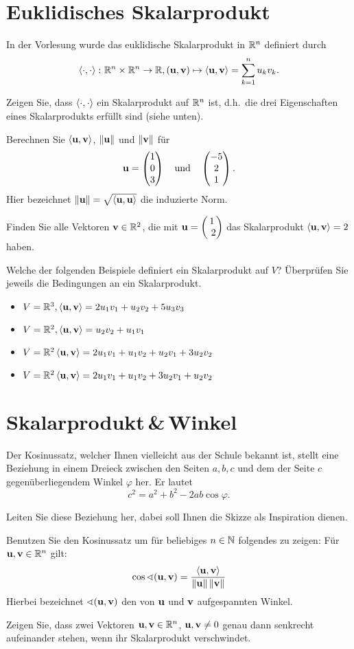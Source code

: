 \documentclass{scrartcl}
\newcommand{\uu}{\mat u}
\newcommand{\vv}{\mat v}
\begin{document}
\section{Euklidisches Skalarprodukt}
In der Vorlesung wurde das euklidische Skalarprodukt in $\RR^n$ definiert durch
\[
  \sp{\cdot}{\cdot} \colon \RR^n \times \RR^n \to \RR, (\uu, \vv) \mapsto \sp{\uu}{\vv} = \sum_{k=1}^n u_k v_k.
\]
\begin{subex}
  \item Zeigen Sie, dass $\sp{\cdot}{\cdot}$ ein Skalarprodukt auf $\RR^n$ ist, d.h.\ die drei Eigenschaften eines Skalarprodukts erfüllt sind (siehe unten).
  \item Berechnen Sie $\sp{\uu}{\vv}$, $\norm{\uu}$ und $\norm{\vv}$ für 
  \[
    \uu = \colvec{1 \\ 0 \\ 3} \quad\mbox{und}\quad \colvec{-5 \\ 2 \\ 1}.
  \]
  Hier bezeichnet $\norm{\uu} = \sqrt{\sp{\uu}{\uu}}$ die induzierte Norm.
  \item Finden Sie alle Vektoren $\vv \in \RR^2$, die mit $\uu = \colvec{1 \\ 2}$ das Skalarprodukt $\sp{\uu}{\vv} = 2$ haben.  
  \item Welche der folgenden Beispiele definiert ein Skalarprodukt auf $V$?
  Überprüfen Sie jeweils die Bedingungen an ein Skalarprodukt.
  \begin{itemize}
    \item $V = \RR^3, \sp{\uu}{\vv} = 2u_1 v_1 +u_2 v_2 +5u_3 v_3$
    \item $V = \RR^2, \sp{\uu}{\vv} = u_2 v_2 + u_1 v_1$
    \item $V =\RR^2 \sp{\uu}{\vv} = 2u_1 v_1 + u_1 v_2 + u_2 v_1 + 3u_2 v_2$
    \item $V =\RR^2 \sp{\uu}{\vv} = 2u_1 v_1 + u_1 v_2 + 3u_2 v_1 + u_2 v_2$
  \end{itemize}
\end{subex}


\section{Skalarprodukt\,\&\,Winkel}
Der Kosinussatz, welcher Ihnen vielleicht aus der Schule bekannt ist, stellt eine Beziehung in einem Dreieck zwischen den Seiten $a,b,c$ und dem der Seite $c$ gegenüberliegendem Winkel $\varphi$ her.
Er lautet
  \[
  c^2=a^2+b^2-2ab\cos \varphi.
  \]
\begin{subex}
  \item Leiten Sie diese Beziehung her, dabei soll Ihnen die Skizze als Inspiration dienen.
  \item Benutzen Sie den Kosinussatz um für beliebiges $n \in \NN$ folgendes zu zeigen: Für $\uu, \vv \in \RR^n$ gilt:
  \[
    \cos \sphericalangle(\uu,\vv) = \frac{\sp{\uu}{\vv}}{\norm{\uu}\norm{\vv}}
  \] 
  Hierbei bezeichnet $\sphericalangle(\uu,\vv)$ den von $\uu$ und $\vv$ aufgespannten Winkel.
  \item Zeigen Sie, dass zwei Vektoren $\uu, \vv \in \RR^n$, $\uu, \vv \neq 0$ genau dann senkrecht aufeinander stehen, wenn ihr Skalarprodukt verschwindet.
\end{subex}
\end{document}
